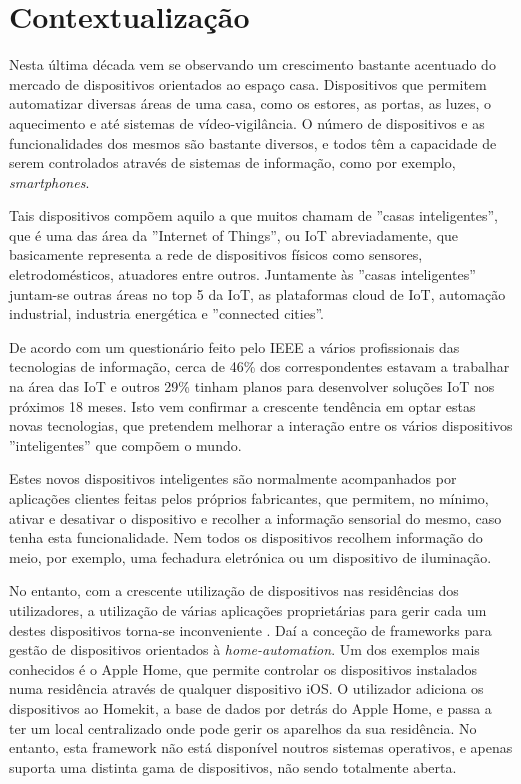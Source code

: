 \chapter{Contextualização}

Nesta última década vem se observando um crescimento bastante acentuado do mercado de dispositivos orientados ao espaço casa. Dispositivos que permitem automatizar diversas áreas de uma casa, como os estores, as portas, as luzes, o aquecimento e até sistemas de vídeo-vigilância. O número de dispositivos e as funcionalidades dos mesmos são bastante diversos, e todos têm a capacidade de serem controlados através de sistemas de informação, como por exemplo, \textit{smartphones}. 

Tais dispositivos compõem aquilo a que muitos chamam de ''casas inteligentes'', que é uma das área da ''Internet of Things'', ou IoT abreviadamente, que basicamente representa a rede de dispositivos físicos como sensores, eletrodomésticos, atuadores entre outros. Juntamente às ''casas inteligentes'' juntam-se outras áreas no top 5 da IoT, as plataformas cloud de IoT, automação industrial, industria energética e ''connected cities''. 

De acordo com um questionário feito pelo IEEE \cite{ieeesurvey} a vários profissionais das tecnologias de informação, cerca de 46\% dos correspondentes estavam a trabalhar na área das IoT e outros 29\% tinham planos para desenvolver soluções IoT nos próximos 18 meses. Isto vem confirmar a crescente tendência em optar estas novas tecnologias, que pretendem melhorar a interação entre os vários dispositivos ''inteligentes'' que compõem o mundo.

Estes novos dispositivos inteligentes são normalmente acompanhados por aplicações clientes feitas pelos próprios fabricantes, que permitem, no mínimo, ativar e desativar o dispositivo e recolher a informação sensorial do mesmo, caso tenha esta funcionalidade. Nem todos os dispositivos recolhem informação do meio, por exemplo, uma fechadura eletrónica ou um dispositivo de iluminação. 

No entanto, com a crescente utilização de dispositivos nas residências dos utilizadores, a utilização de várias aplicações proprietárias para gerir cada um destes dispositivos torna-se inconveniente \cite{iot-survey-issues}. Daí a conceção de frameworks para gestão de dispositivos orientados à \textit{home-automation}. Um dos exemplos mais conhecidos é o Apple Home, que permite controlar os dispositivos instalados numa residência através de qualquer dispositivo iOS. O utilizador adiciona os dispositivos ao Homekit, a base de dados por detrás do Apple Home, e passa a ter um local centralizado onde pode gerir os aparelhos da sua residência. No entanto, esta framework não está disponível noutros sistemas operativos, e apenas suporta uma distinta gama de dispositivos, não sendo totalmente aberta. 

